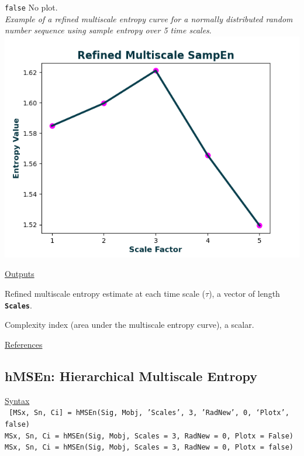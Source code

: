 \documentclass[12pt, a4paper, titlepage, openany]{book}
\begin{document}
\begin{description}[labelsep=1cm, labelwidth=2cm, nosep, style=multiline,leftmargin=3cm]
							\texttt{false}\hspace{12pt} No plot.\\
\textit{Example of a refined multiscale entropy curve for a normally distributed random number sequence using sample entropy over 5 time scales}.\\
							\includegraphics[scale=.7]{rMSEn1.png}
\end{description}

\noindent \ul{Outputs}
\begin{description}[labelsep=1cm, labelwidth=2cm, nosep, style=multiline,leftmargin=3cm]\footnotesize
\item[\texttt{MSx}]		Refined multiscale entropy estimate at each time scale ($\tau$), a vector of length 											\textbf{\texttt{Scales}}.
\item[\texttt{Ci}]		Complexity index (area under the multiscale entropy curve), a scalar.
\end{description}

\noindent \ul{References}\hspace{1cm}
\cite{MS1} \cite{MS2} \cite{MS3} \cite{rMS1} \cite{rMS2} 



\newpage
\subsection{\normalsize hMSEn: \hspace{15mm} Hierarchical Multiscale Entropy}
\noindent\ul{Syntax} \vspace{6mm} \\ \noindent \texttt{\footnotesize
[MSx, Sn, Ci] = hMSEn(Sig, Mobj, 'Scales', 3, 'RadNew', 0, ‘Plotx’, false)\\
MSx, Sn, Ci = hMSEn(Sig, Mobj, Scales = 3, RadNew = 0, Plotx = False)\\ 
MSx, Sn, Ci = hMSEn(Sig, Mobj, Scales = 3, RadNew = 0, Plotx = false)}
\end{document}
